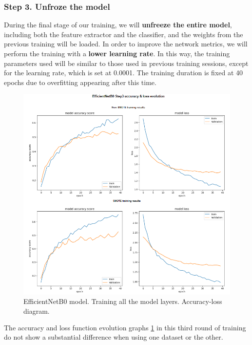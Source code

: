 \newpage
\subsubsection{Step 3. Unfroze the model}

During the final stage of our training, we will \textbf{unfreeze the entire model}, including both the feature extractor and the classifier, and the weights from the previous training will be loaded. In order to improve the network metrics, we will perform the training with a \textbf{lower learning rate}. In this way, the training parameters used will be similar to those used in previous training sessions, except for the learning rate, which is set at 0.0001. The training duration is fixed at 40 epochs due to overfitting appearing after this time.

\begin{figure}[ht]
    \begin{center}
        \includegraphics[scale=0.60]{images/Building/Model Efficientnet/modelENetB0_3_model accuray-loss.png}
        \caption{EfficientNetB0 model. Training all the model layers. Accuracy-loss diagram.}
    \label{fig: Model_ENet_3_accuracy_loss}    
    \end{center}
\end{figure}

The accuracy and loss function evolution graphs \ref{fig: Model_ENet_3_accuracy_loss} in this third round of training do not show a substantial difference when using one dataset or the other.


